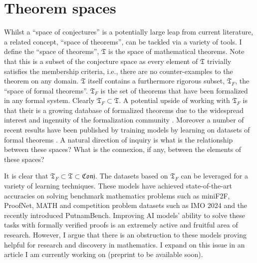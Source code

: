 \section{Theorem spaces}
Whilst a ``space of conjectures'' is a potentially large leap from current literature, a related concept, ``space of theorems'', can be tackled via a variety of tools.
I define the ``space of theorems'', $\mathfrak{T}$ is the space of mathematical theorems. Note that this is a subset of the conjecture space as every element of $\mathfrak{T}$ trivially satisfies the membership criteria, i.e.,
there are no counter-examples to the theorem on any domain.
$\mathfrak{T}$ itself contains a furthermore rigorous subset, $\mathfrak{T}_F$, the ``space of formal theorems''. $\mathfrak{T}_F$ is the set of theorems that have been formalized in any formal system. Clearly $\mathfrak{T}_F\subset\mathfrak{T}$. A potential upside of working with $\mathfrak{T}_F$ is that their is a growing database of formalized theorems due to the widespread interest and ingenuity of the formalization community \cite{formalization_examples}.
Moreover a number of recent results have been published by training models by learning on datasets of formal theorems \cite{Deepmind_stuff}. A natural direction of inquiry is what is the relationship between these spaces? What is the connexion, if any, between the elements of these spaces?
\\\par
It is clear that $\mathfrak{T}_F\subset\mathfrak{T}\subset\mathfrak{Conj}$. The datasets based on $\mathfrak{T}_F$ can be leveraged for a variety of learning techniques. These models have achieved state-of-the-art accuracies on solving benchmark mathematics problems such as miniF2F, ProofNet, MATH and competition problem datasets such as IMO 2024 and the recently introduced PutnamBench. Improving AI models' ability to solve these tasks with formally verified proofs
is an extremely active and fruitful area of research. However, I argue that there is an obstruction to these models proving helpful for research and discovery in mathematics. I expand on this issue in an article I am currently working on (preprint to be available soon). 

